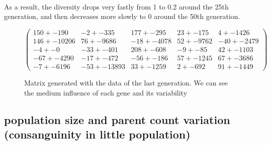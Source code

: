 \documentclass[]{report} %
\begin{document}
    \paragraph*{}
    As a result, the diversity drops very fastly from 1 to 0.2 around the 25th generation, and then decreases more slowly to 0 around the 50th generation.
   

    \begin{figure}[H] 
            \centering
            \small
    $
          \begin{pmatrix}
                150 +- 190 & -2 +- 335 & 177 +- 295 & 23 +- 175 & 4 +- 1426 \\
                146 +- 10206 & 76 +- 9686 & -18 +- 4078 & 52 +- 9762 & -40 +- 2479 \\
                -4 +- 0 & -33 +- 401 & 208 +- 608 & -9 +- 85 & 42 +- 1103 \\
                -67 +- 4290 & -17 +- 472 & -56 +- 186 & 57 +- 1245 & 67 +- 3686 \\
                -7 +- 6196 & -53 +- 13893 & 33 +- 1259 & 2 +- 692 & 91 +- 1449 
           \end{pmatrix}
    $
            \caption{\footnotesize Matrix generated with the data of the last generation. We can see the medium influence of each gene and its variability}
            \label{mat:ps20xg200xmr1-10-4}
    \end{figure}
    
    
    
\subsection{population size and parent count variation  (consanguinity in little population)}
\end{document}
